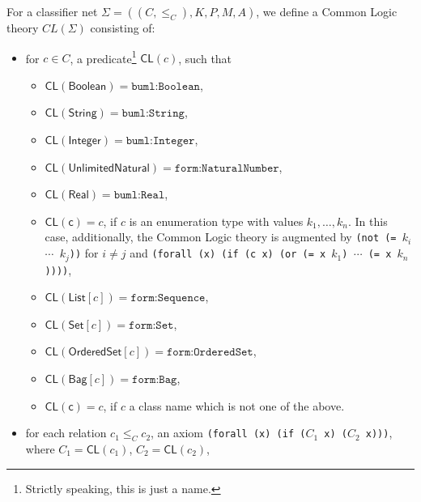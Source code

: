 \documentclass[10pt,fleqn,%
\ifpretendfinal
final%
\else
draft%
\fi,
]{scrreprt}
\newcommand*{\CL}{\ensuremath{\mathsf{CL}}\xspace}
\begin{document}
For a classifier net
$\Sigma = ((C, {\leq_C}), K, P, M, A)$, we define a Common Logic theory
$CL(\Sigma)$ consisting of:
%
\begin{itemize} %
\item for $c \in C$, a predicate\footnote{Strictly speaking, this is just a name.} $\CL(c)$,  such that 
\begin{itemize} %
\item 
  $\CL(\mathsf{Boolean}) = \texttt{buml:Boolean}$, 
\item 
  $\CL(\mathsf{String}) = \texttt{buml:String}$,
\item 
  $\CL(\mathsf{Integer}) = \texttt{buml:Integer}$,
\item 
  $\CL(\mathsf{UnlimitedNatural}) = \texttt{form:NaturalNumber}$,
\item 
  $\CL(\mathsf{Real}) = \texttt{buml:Real}$,
\item 
  $\CL(\mathsf{c}) = c$, if $c$ is an enumeration type with values $k_1,\ldots,k_n$. In this case, additionally, the Common Logic theory is augmented by
\texttt{(not (= $k_i$ $\cdots$ $k_j$))} for $i\neq j$ and
\texttt{(forall (x) (if (c x) (or (= x $k_1$) $\cdots$ (= x $k_n$))))},
\item 
  $\CL(\mathsf{List}[c]) = \texttt{form:Sequence}$,
\item 
  $\CL(\mathsf{Set}[c]) = \texttt{form:Set}$,
\item 
  $\CL(\mathsf{OrderedSet}[c]) = \texttt{form:OrderedSet}$,
\item 
  $\CL(\mathsf{Bag}[c]) = \texttt{form:Bag}$,
\item 
  $\CL(\mathsf{c}) = c$, if $c$ a class name which is not one of the above. 
\end{itemize}
\item for each relation $c_1
  \leq_C c_2$, an axiom \texttt{(forall (x) (if ($C_1$ x) ($C_2$ x)))},
  where $C_1 = \CL(c_1)$, $C_2 = \CL(c_2)$, 


\end{itemize}
\end{document}
